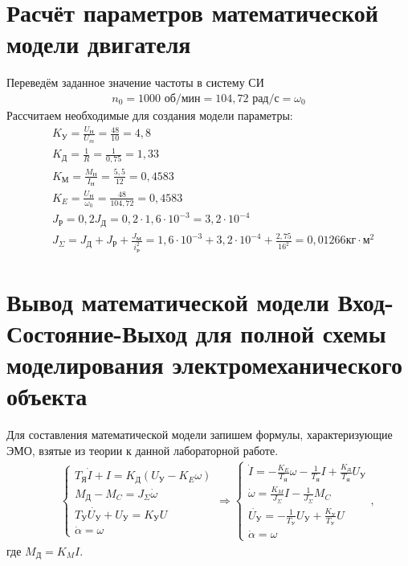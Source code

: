 \documentclass[fleqn, a4paper, 11pt, russian]{article}
\begin{document}
    \section{Расчёт параметров математической модели двигателя}
    Переведём заданное значение частоты в систему СИ
    \begin{align}
		n_0 = 1000 \text{ об/мин} = 104,72 \text{ рад/с} = \omega_0
    \end{align}
    Рассчитаем необходимые для создания модели параметры:
    \begin{align}
    	&K_\text{У} = \frac{U_\text{Н}}{U_m} = \frac{48}{10} = 4,8\\
    	&K_\text{Д} = \frac{1}{R} = \frac{1}{0,75} = 1,33\\
    	&K_\text{М} = \frac{M_\text{Н}}{I_\text{Н}} = \frac{5,5}{12} = 0,4583\\
    	&K_E = \frac{U_\text{Н}}{\omega_0} = \frac{48}{104,72} = 0,4583\\
    	&J_\text{Р} = 0,2J_\text{Д} = 0,2 \cdot 1,6\cdot10^{-3} = 3,2\cdot10^{-4}\\
    	&J_\Sigma = J_\text{Д} + J_\text{Р} + \frac{J_\text{М}}{i_\text{Р}^2} = 1,6\cdot10^{-3} + 3,2\cdot10^{-4} + \frac{2,75}{16^2} = 0,01266 \text{кг}\cdot\text{м}^2
	\end{align}
	\clearpage
	\section{Вывод математической модели Вход-Состояние-Выход для полной схемы моделирования электромеханического объекта}
	Для составления математической модели запишем формулы, характеризующие ЭМО, взятые из теории к данной лабораторной работе.
	\begin{align}
		&&\begin{cases}
			T_\text{Я}\dot{I} + I = K_\text{Д}(U_\text{У} - K_E\omega)\\
			M_\text{Д} - M_C = J_\Sigma\dot{\omega}\\
			T_\text{У}\dot{U_\text{У}} + U_\text{У} = K_\text{У}U\\
			\dot{\alpha} = \omega
		\end{cases}
		\Rightarrow
		\begin{cases}
			\dot{I} = -\displaystyle{\frac{K_E}{T_\text{Я}}}\omega - \frac{1}{T_\text{Я}}I + \frac{K_\text{Д}}{T_\text{Я}}U_\text{У}\\
			\dot{\omega} = \displaystyle{\frac{K_M}{J_\Sigma}}I - \frac{1}{J_\Sigma}M_C\\
			\dot{U_\text{У}} = -\displaystyle{\frac{1}{T_\text{У}}U_\text{У}} + \frac{K_\text{У}}{T_\text{У}}U\\
			\dot{\alpha} = \omega
		\end{cases}
		,
		\label{ESETh}
	\end{align}
	где $M_\text{Д} = K_MI$.
	
\end{document}
